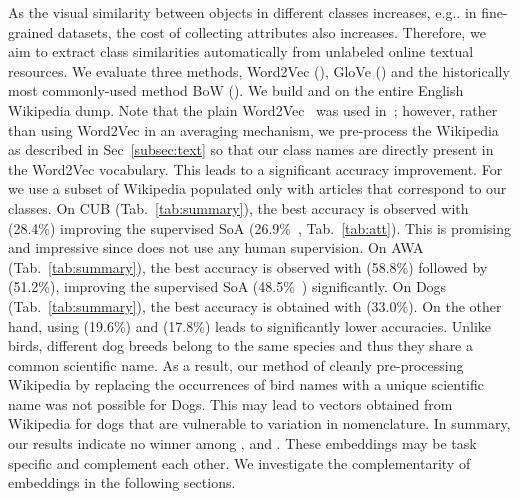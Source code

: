\documentclass[10pt,twocolumn,letterpaper]{article}
\makeatletter
\newcommand{\cutcaptiondown}{\vspace*{-0.12in}}
\newcommand{\myparagraph}[1]{\vspace{2pt}\noindent{\bf #1}}
\DeclareRobustCommand\onedot{\futurelet\@let@token\@onedot}
\def\@onedot{\ifx\@let@token.\else.\null\fi\xspace}
\def\eg{{e.g}\onedot} \def\Eg{{E.g}\onedot}
\makeatother
\begin{document}
\myparagraph{Learned Embeddings from Text.} 
As the visual similarity between objects in different classes increases, \eg in fine-grained datasets, the cost of collecting attributes also increases. Therefore, we aim to extract class similarities automatically from unlabeled online textual resources. 
We evaluate three methods, Word2Vec (), GloVe () and the historically most commonly-used method BoW (). We build  and  on the entire English Wikipedia dump. Note that the plain Word2Vec~\cite{MSCCD13} was used in~\cite{APHS15}; however, rather than using Word2Vec in an averaging mechanism, we pre-process the Wikipedia as described in Sec~\ref{subsec:text} so that our class names are directly present in the Word2Vec vocabulary. This leads to a significant accuracy improvement. For  we use a subset of Wikipedia populated only with articles that correspond to our classes. 
On CUB (Tab.~\ref{tab:summary}), the best accuracy is observed with  (28.4\%) improving the supervised SoA (26.9\%~\cite{APHS15}, Tab.~\ref{tab:att}).
This is promising and impressive since  does not use any human supervision.
On AWA (Tab.~\ref{tab:summary}), the best accuracy is observed with  (58.8\%) followed by  (51.2\%), improving the supervised SoA (48.5\%~\cite{APHS15}) significantly.
On Dogs (Tab.~\ref{tab:summary}), the best accuracy is obtained with  (33.0\%). On the other hand, using  (19.6\%) and  (17.8\%) leads to significantly lower accuracies. 
Unlike birds, different dog breeds belong to the same species and thus they share a common scientific name. As a result, our method of cleanly pre-processing Wikipedia by replacing the occurrences of bird names with a unique scientific name was not  possible for Dogs. This may lead to vectors obtained from Wikipedia for dogs that are vulnerable to variation in nomenclature.
In summary, our results indicate no winner among ,  and . These embeddings may be task specific and complement each other. We investigate the complementarity of embeddings in the following sections.


\begin{table}[t]
 \begin{center}
 \end{center}
\caption{Comparison of Word2Vec () and GloVe () learned from a bird specific corpus (B), Wikipedia (W) and their combination (B + W), evaluated on CUB (Input embeddings: 4K-FV, 4K-CNN and 1K-GOOG).}
\cutcaptiondown
\label{tab:text_corpora}
\end{table}
\end{document}
